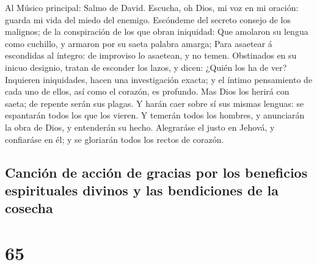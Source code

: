  Al Músico principal: Salmo de David. Escucha, oh Dios, mi
voz en mi oración: guarda mi vida del miedo del enemigo. 
Escóndeme del secreto consejo de los malignos; de la conspiración de los
que obran iniquidad:  Que amolaron su lengua como
cuchillo, y armaron por su saeta palabra amarga;  Para
asaetear á escondidas al íntegro: de improviso lo asaetean, y no temen.
 Obstinados en su inicuo designio, tratan de esconder los
lazos, y dicen: ¿Quién los ha de ver?  Inquieren
iniquidades, hacen una investigación exacta; y el íntimo pensamiento de
cada uno de ellos, así como el corazón, es profundo.  Mas
Dios los herirá con saeta; de repente serán sus plagas.  Y
harán caer sobre sí sus mismas lenguas: se espantarán todos los que los
vieren.  Y temerán todos los hombres, y anunciarán la obra
de Dios, y entenderán su hecho.  Alegraráse el justo en
Jehová, y confiaráse en él; y se gloriarán todos los rectos de corazón.

\hypertarget{canciuxf3n-de-acciuxf3n-de-gracias-por-los-beneficios-espirituales-divinos-y-las-bendiciones-de-la-cosecha}{%
\subsection{Canción de acción de gracias por los beneficios espirituales
divinos y las bendiciones de la
cosecha}\label{canciuxf3n-de-acciuxf3n-de-gracias-por-los-beneficios-espirituales-divinos-y-las-bendiciones-de-la-cosecha}}

\hypertarget{section-64}{%
\section{65}\label{section-64}}

